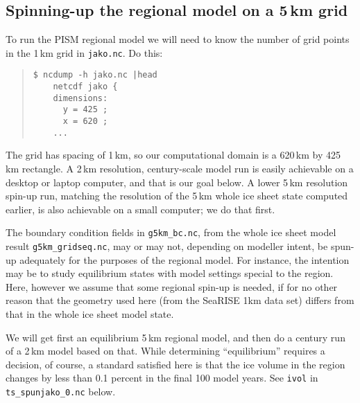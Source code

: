 \subsection*{Spinning-up the regional model on a 5\,km grid}
To run the PISM regional model we will need to know the number of grid points in the 1\,km grid in \verb|jako.nc|.  Do this:
\begin{quote}\small
\begin{verbatim}
$ ncdump -h jako.nc |head
    netcdf jako {
    dimensions:
      y = 425 ;
      x = 620 ;
    ...
\end{verbatim}
\normalsize\end{quote}
The grid has spacing of 1\,km, so our computational domain is a 620\,km by 425\,km rectangle.  A 2\,km resolution, century-scale model run is easily achievable on a desktop or laptop computer, and that is our goal below.  A lower 5\,km resolution spin-up run, matching the resolution of the 5\,km whole ice sheet state computed earlier, is also achievable on a small computer; we do that first.

The boundary condition fields in \verb|g5km_bc.nc|, from the whole ice sheet model result  \verb|g5km_gridseq.nc|, may or may not, depending on modeller intent, be spun-up adequately for the purposes of the regional model.  For instance, the intention may be to study equilibrium states with model settings special to the region.  Here, however we assume that some regional spin-up is needed, if for no other reason that the geometry used here (from the SeaRISE 1km data set) differs from that in the whole ice sheet model state.

We will get first an equilibrium 5\,km regional model, and then do a century run of a 2\,km model based on that.  While determining ``equilibrium'' requires a decision, of course, a standard satisfied here is that the ice volume in the region changes by less than 0.1 percent in the final 100 model years.  See \texttt{ivol} in \texttt{ts_spunjako_0.nc} below.

